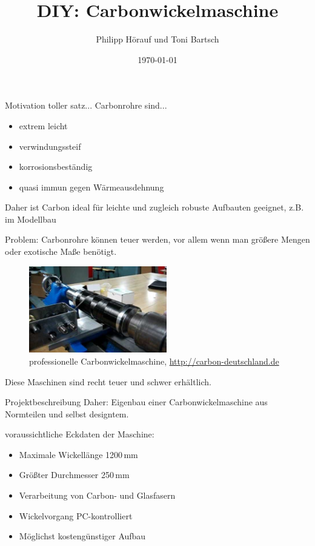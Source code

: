 \documentclass[12pt]{beamer}
\author{Philipp Hörauf und Toni Bartsch}
\title{DIY: Carbonwickelmaschine}
\date{\today}
\begin{document}
\begin{frame}
\titlepage
\end{frame}


\begin{frame}
\tableofcontents
\end{frame}


\begin{frame}{Motivation}
toller satz...\newline
\vspace{1cm}
\pause
Carbonrohre sind...
\begin{itemize}
	\item<1-> extrem leicht
	\item<2-> verwindungssteif
	\item<3-> korrosionsbeständig
	\item<4-> quasi immun gegen Wärmeausdehnung
\end{itemize}
\vspace*{1cm}
\pause 
Daher ist Carbon ideal für leichte und zugleich robuste Aufbauten geeignet, z.B. im Modellbau
\end{frame}


\begin{frame}
Problem: Carbonrohre können teuer werden, vor allem wenn man größere Mengen oder exotische Maße benötigt.\newline

\begin{figure}
	\includegraphics[width=6cm]{./hqdefault.jpg}
	\caption{professionelle Carbonwickelmaschine, \url{http://carbon-deutschland.de}}
\end{figure}

Diese Maschinen sind recht teuer und schwer erhältlich.
\end{frame}


\begin{frame}{Projektbeschreibung}
Daher: Eigenbau einer Carbonwickelmaschine aus Normteilen und selbst designtem.\newline
\vspace{0.5cm}

\pause
voraussichtliche Eckdaten der Maschine:
\begin{itemize}
	\item<1-> Maximale Wickellänge 1200\,mm
	\item<2-> Größter Durchmesser 250\,mm
	\item<3-> Verarbeitung von Carbon- und Glasfasern
	\item<4-> Wickelvorgang PC-kontrolliert
	\item<5-> Möglichst kostengünstiger Aufbau
\end{itemize}
\end{frame}
\end{document}
